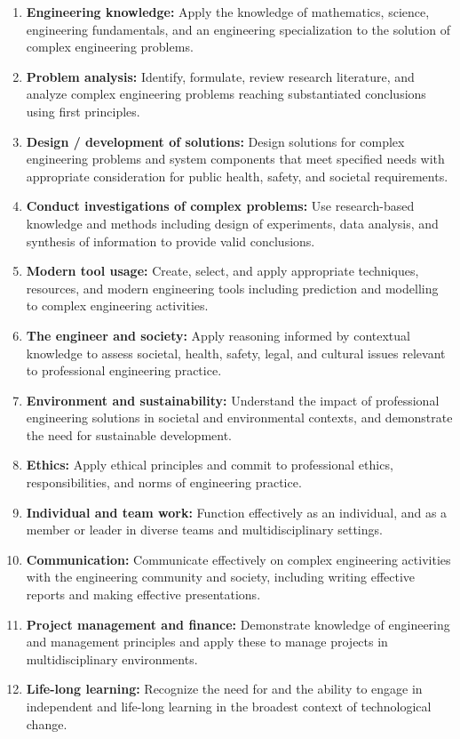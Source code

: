 \documentclass[12pt,a4paper]{report}
\begin{document}
\clearpage
\pagestyle{empty}
\par\vspace{0.2cm}
\begin{enumerate}[leftmargin=0.5in, label=\arabic*., topsep=4pt, itemsep=3pt]
    \item \textbf{Engineering knowledge:} Apply the knowledge of mathematics, science, engineering fundamentals, and an engineering specialization to the solution of complex engineering problems.
    \item \textbf{Problem analysis:} Identify, formulate, review research literature, and analyze complex engineering problems reaching substantiated conclusions using first principles.
    \item \textbf{Design / development of solutions:} Design solutions for complex engineering problems and system components that meet specified needs with appropriate consideration for public health, safety, and societal requirements.
    \item \textbf{Conduct investigations of complex problems:} Use research-based knowledge and methods including design of experiments, data analysis, and synthesis of information to provide valid conclusions.
    \item \textbf{Modern tool usage:} Create, select, and apply appropriate techniques, resources, and modern engineering tools including prediction and modelling to complex engineering activities.
    \item \textbf{The engineer and society:} Apply reasoning informed by contextual knowledge to assess societal, health, safety, legal, and cultural issues relevant to professional engineering practice.
    \item \textbf{Environment and sustainability:} Understand the impact of professional engineering solutions in societal and environmental contexts, and demonstrate the need for sustainable development.
    \item \textbf{Ethics:} Apply ethical principles and commit to professional ethics, responsibilities, and norms of engineering practice.
    \item \textbf{Individual and team work:} Function effectively as an individual, and as a member or leader in diverse teams and multidisciplinary settings.
    \item \textbf{Communication:} Communicate effectively on complex engineering activities with the engineering community and society, including writing effective reports and making effective presentations.
    \item \textbf{Project management and finance:} Demonstrate knowledge of engineering and management principles and apply these to manage projects in multidisciplinary environments.
    \item \textbf{Life-long learning:} Recognize the need for and the ability to engage in independent and life-long learning in the broadest context of technological change.
\end{enumerate}
\end{document}
